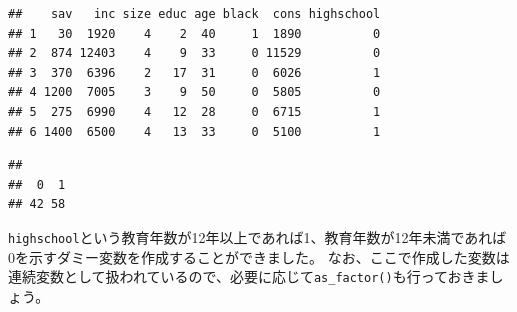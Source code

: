 \documentclass[]{book}
\newenvironment{Shaded}{\begin{snugshade}}{\end{snugshade}}
\newcommand{\KeywordTok}[1]{\textcolor[rgb]{0.13,0.29,0.53}{\textbf{#1}}}
\newcommand{\DataTypeTok}[1]{\textcolor[rgb]{0.13,0.29,0.53}{#1}}
\newcommand{\DecValTok}[1]{\textcolor[rgb]{0.00,0.00,0.81}{#1}}
\newcommand{\StringTok}[1]{\textcolor[rgb]{0.31,0.60,0.02}{#1}}
\newcommand{\CommentTok}[1]{\textcolor[rgb]{0.56,0.35,0.01}{\textit{#1}}}
\newcommand{\OperatorTok}[1]{\textcolor[rgb]{0.81,0.36,0.00}{\textbf{#1}}}
\newcommand{\NormalTok}[1]{#1}
\begin{document}
\begin{Shaded}
\end{Shaded}

\begin{verbatim}
##    sav   inc size educ age black  cons highschool
## 1   30  1920    4    2  40     1  1890          0
## 2  874 12403    4    9  33     0 11529          0
## 3  370  6396    2   17  31     0  6026          1
## 4 1200  7005    3    9  50     0  5805          0
## 5  275  6990    4   12  28     0  6715          1
## 6 1400  6500    4   13  33     0  5100          1
\end{verbatim}

\begin{Shaded}
\end{Shaded}

\begin{verbatim}
## 
##  0  1 
## 42 58
\end{verbatim}

\texttt{highschool}という教育年数が12年以上であれば1、教育年数が12年未満であれば0を示すダミー変数を作成することができました。
なお、ここで作成した変数は連続変数として扱われているので、必要に応じて\texttt{as\_factor()}も行っておきましょう。

\begin{Shaded}
\end{Shaded}
\end{document}
